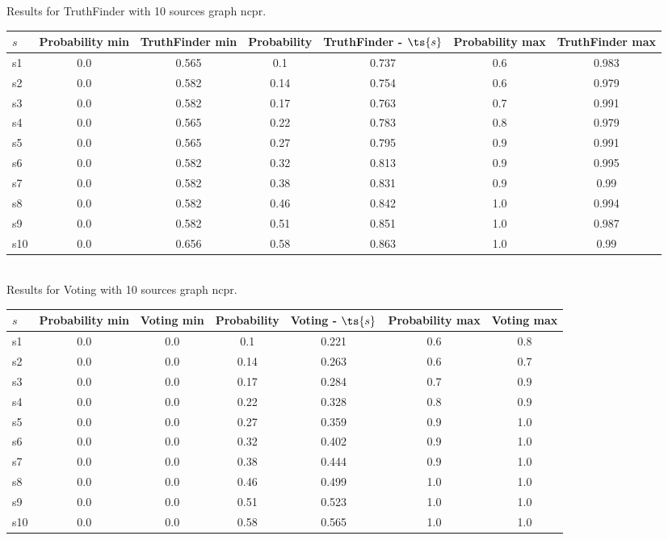 \documentclass{article}
\begin{document}
\noindent Results for TruthFinder with 10 sources graph ncpr.

\noindent\begin{tabular}{|l|c|c|c|c|c|c|}
\hline
$s$& Probability min & TruthFinder min & Probability & TruthFinder - $\ts{s}$ & Probability max & TruthFinder max\\
\hline
s1 &0.0 & 0.565 & 0.1 & 0.737 & 0.6 & 0.983\\
\hline
s2 &0.0 & 0.582 & 0.14 & 0.754 & 0.6 & 0.979\\
\hline
s3 &0.0 & 0.582 & 0.17 & 0.763 & 0.7 & 0.991\\
\hline
s4 &0.0 & 0.565 & 0.22 & 0.783 & 0.8 & 0.979\\
\hline
s5 &0.0 & 0.565 & 0.27 & 0.795 & 0.9 & 0.991\\
\hline
s6 &0.0 & 0.582 & 0.32 & 0.813 & 0.9 & 0.995\\
\hline
s7 &0.0 & 0.582 & 0.38 & 0.831 & 0.9 & 0.99\\
\hline
s8 &0.0 & 0.582 & 0.46 & 0.842 & 1.0 & 0.994\\
\hline
s9 &0.0 & 0.582 & 0.51 & 0.851 & 1.0 & 0.987\\
\hline
s10 &0.0 & 0.656 & 0.58 & 0.863 & 1.0 & 0.99\\
\hline
\end{tabular}\\

\noindent Results for Voting with 10 sources graph ncpr.

\noindent\begin{tabular}{|l|c|c|c|c|c|c|}
\hline
$s$& Probability min & Voting min & Probability & Voting - $\ts{s}$ & Probability max & Voting max\\
\hline
s1 &0.0 & 0.0 & 0.1 & 0.221 & 0.6 & 0.8\\
\hline
s2 &0.0 & 0.0 & 0.14 & 0.263 & 0.6 & 0.7\\
\hline
s3 &0.0 & 0.0 & 0.17 & 0.284 & 0.7 & 0.9\\
\hline
s4 &0.0 & 0.0 & 0.22 & 0.328 & 0.8 & 0.9\\
\hline
s5 &0.0 & 0.0 & 0.27 & 0.359 & 0.9 & 1.0\\
\hline
s6 &0.0 & 0.0 & 0.32 & 0.402 & 0.9 & 1.0\\
\hline
s7 &0.0 & 0.0 & 0.38 & 0.444 & 0.9 & 1.0\\
\hline
s8 &0.0 & 0.0 & 0.46 & 0.499 & 1.0 & 1.0\\
\hline
s9 &0.0 & 0.0 & 0.51 & 0.523 & 1.0 & 1.0\\
\hline
s10 &0.0 & 0.0 & 0.58 & 0.565 & 1.0 & 1.0\\
\hline
\end{tabular}\\
\end{document}
